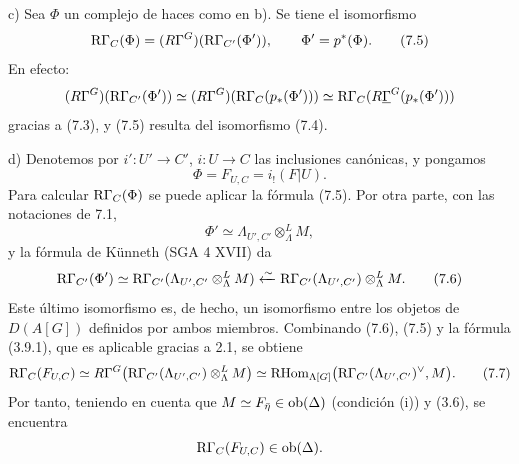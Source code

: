 c) Sea $\Phi$ un complejo de haces como en b). Se tiene el isomorfismo
\[
\mathrm R\Gamma_C(\Phi)=(R\Gamma^G)(\mathrm R\Gamma_{C'}(\Phi')),
\qquad \Phi'=p^*(\Phi).
\tag{7.5}
\]
En efecto:
\[
(R\Gamma^G)(\mathrm R\Gamma_{C'}(\Phi'))
\simeq
(R\Gamma^G)(\mathrm R\Gamma_C(p_*(\Phi')))
\simeq
\mathrm R\Gamma_C(R\underline{\Gamma}^G(p_*(\Phi')))
\]
gracias a (7.3), y (7.5) resulta del isomorfismo (7.4).

d) Denotemos por $i':U'\to C'$, $i:U\to C$ las inclusiones canónicas, y pongamos
\[
\Phi=F_{U,C}=i_!(F|U).
\]
Para calcular $\mathrm R\Gamma_C(\Phi)$ se puede aplicar la fórmula (7.5). Por otra parte, con las notaciones de 7.1,
\[
\Phi'\simeq \Lambda_{U',C'}\otimes_\Lambda^L M,
\]
y la fórmula de Künneth (SGA 4 XVII) da
\[
\mathrm R\Gamma_{C'}(\Phi')
\simeq
\mathrm R\Gamma_{C'}(\Lambda_{U',C'}\otimes_\Lambda^L M)
\xleftarrow{\sim}
\mathrm R\Gamma_{C'}(\Lambda_{U',C'})\otimes_\Lambda^L M.
\tag{7.6}
\]
Este último isomorfismo es, de hecho, un isomorfismo entre los objetos de $D(A[G])$ definidos por ambos miembros. Combinando (7.6), (7.5) y la fórmula (3.9.1), que es aplicable gracias a 2.1, se obtiene
\[
\mathrm R\Gamma_C(F_{U,C})
\simeq
R\Gamma^G\bigl(\mathrm R\Gamma_{C'}(\Lambda_{U',C'})\otimes_\Lambda^L M\bigr)
\simeq
\mathrm{RHom}_{\Lambda[G]}\bigl(\mathrm R\Gamma_{C'}(\Lambda_{U',C'})^\vee,M\bigr).
\tag{7.7}
\]
Por tanto, teniendo en cuenta que $M\simeq F_{\bar\eta}\in\operatorname{ob}(\Delta)$ (condición (i)) y (3.6), se encuentra
\[
\mathrm R\Gamma_C(F_{U,C})\in\operatorname{ob}(\Delta).
\]
